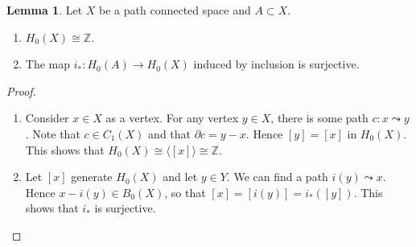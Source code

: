 \documentclass[10pt,letterpaper,cm]{nupset}
\theoremstyle{definition}
\theoremstyle{theorem}
\newtheorem{lemma}[definition]{Lemma}
\theoremstyle{remark}
\newcommand{\Z}{\mathbb Z}
\newcommand{\1}{\mathbb{1}}
\newcommand{\0}{\vec 0}
\begin{document}
\begin{lemma}\label{l21} Let $X$ be a path connected space and $A\subset X$.
\begin{enumerate}
\item $H_0(X) \cong \Z$.
\item The map $i_{\ast}: H_0(A) \to H_0(X)$ induced by inclusion is surjective. 
\end{enumerate}
\end{lemma}
\begin{proof} $ $
\begin{enumerate} 
\item Consider $x\in X$ as a vertex. For any vertex $y\in X$, there is some path $c: x\leadsto y$. Note that $c \in C_1(X)$ and that $\partial{c}= y-x$. Hence $\left[y\right]= \left[x\right]$ in $H_0(X)$. This shows that $H_0(X) \cong \langle \left[x\right] \rangle \cong \Z$.
\item Let $[x]$ generate $H_0(X)$ and let $y\in Y$. We can find a path $i(y) \leadsto x$. Hence $x-i(y)\in B_0(X)$, so that $[x] =\left[i(y)\right]= i_{\ast}([y])$. This shows that $i_{\ast}$ is surjective.
\end{enumerate}
\end{proof}
\end{document}
